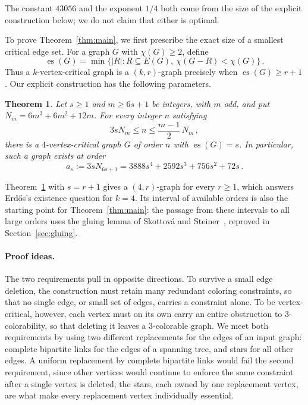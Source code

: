 \documentclass[11pt,letterpaper]{article}
\numberwithin{equation}{section}
\theoremstyle{plain}
\newtheorem{mainthm}{Theorem}
\theoremstyle{definition}
\theoremstyle{remark}
\DeclareMathOperator{\es}{es}
\newcommand{\N}[1]{N_{#1}}
\begin{document}
The constant $43056$ and the exponent $1/4$ both come from the size of the explicit construction below; we do not claim that either is optimal.

To prove Theorem~\ref{thm:main}, we first prescribe the exact size of a smallest critical edge set. For a graph $G$ with $\chi(G)\ge 2$, define
\begin{equation}\label{eq:es}
  \es(G)=\min\{|R|: R\subseteq E(G),\ \chi(G-R)<\chi(G)\}\,.
\end{equation}
Thus a $k$-vertex-critical graph is a $(k,r)$-graph precisely when $\es(G)\ge r+1$. Our explicit construction has the following parameters.

\begin{mainthm}\label{thm:intervals}
Let $s\ge 1$ and $m\ge 6s+1$ be integers, with $m$ odd, and put $\N{m}=6m^3+6m^2+12m$. For every integer $n$ satisfying
\begin{equation*}
  3s\N{m}\le n\le\frac{m-1}{2}\,\N{m}\,,
\end{equation*}
there is a $4$-vertex-critical graph $G$ of order $n$ with $\es(G)=s$. In particular, such a graph exists at order
\begin{equation}\label{eq:as}
  a_s:=3s\N{6s+1}=3888s^4+2592s^3+756s^2+72s\,.
\end{equation}
\end{mainthm}

Theorem~\ref{thm:intervals} with $s=r+1$ gives a $(4,r)$-graph for every $r\ge 1$, which answers Erd\H{o}s's existence question for $k=4$. Its interval of available orders is also the starting point for Theorem~\ref{thm:main}: the passage from these intervals to all large orders uses the gluing lemma of Skottov\'a and Steiner~\cite[Lemma~2.1]{SkottovaSteiner}, reproved in Section~\ref{sec:gluing}.

\paragraph{Proof ideas.}
The two requirements pull in opposite directions. To survive a small edge deletion, the construction must retain many redundant coloring constraints, so that no single edge, or small set of edges, carries a constraint alone. To be vertex-critical, however, each vertex must on its own carry an entire obstruction to $3$-colorability, so that deleting it leaves a $3$-colorable graph. We meet both requirements by using two different replacements for the edges of an input graph: complete bipartite links for the edges of a spanning tree, and stars for all other edges. A uniform replacement by complete bipartite links would fail the second requirement, since other vertices would continue to enforce the same constraint after a single vertex is deleted; the stars, each owned by one replacement vertex, are what make every replacement vertex individually essential.
\end{document}

